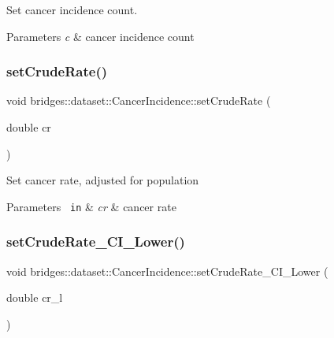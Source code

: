 Set cancer incidence count. 


\begin{DoxyParams}{Parameters}
{\em c} & cancer incidence count \\
\hline
\end{DoxyParams}
\mbox{\label{classbridges_1_1dataset_1_1_cancer_incidence_ad9bcbee58cbcb2b23d50f78e034faeb3}} 
\subsubsection{\texorpdfstring{setCrudeRate()}{setCrudeRate()}}
{\footnotesize\ttfamily void bridges\+::dataset\+::\+Cancer\+Incidence\+::set\+Crude\+Rate (\begin{DoxyParamCaption}\item[{double}]{cr }\end{DoxyParamCaption})\hspace{0.3cm}{\ttfamily [inline]}}

Set cancer rate, adjusted for population


\begin{DoxyParams}[1]{Parameters}
\mbox{\texttt{ in}}  & {\em cr} & cancer rate \\
\hline
\end{DoxyParams}
\mbox{\label{classbridges_1_1dataset_1_1_cancer_incidence_af75985ca4df5b0138312128580281cd8}} 
\subsubsection{\texorpdfstring{setCrudeRate\_CI\_Lower()}{setCrudeRate\_CI\_Lower()}}
{\footnotesize\ttfamily void bridges\+::dataset\+::\+Cancer\+Incidence\+::set\+Crude\+Rate\+\_\+\+C\+I\+\_\+\+Lower (\begin{DoxyParamCaption}\item[{double}]{cr\+\_\+l }\end{DoxyParamCaption})\hspace{0.3cm}{\ttfamily [inline]}}


